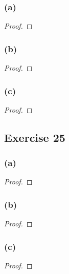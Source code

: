 \documentclass[14pt]{extarticle}
\begin{document}
\subsubsection{(a)}

\begin{proof}

\end{proof}

\subsubsection{(b)}

\begin{proof}

\end{proof}

\subsubsection{(c)}

\begin{proof}

\end{proof}

\subsection{Exercise 25}

\subsubsection{(a)}

\begin{proof}

\end{proof}

\subsubsection{(b)}

\begin{proof}

\end{proof}

\subsubsection{(c)}

\begin{proof}

\end{proof}
\end{document}

